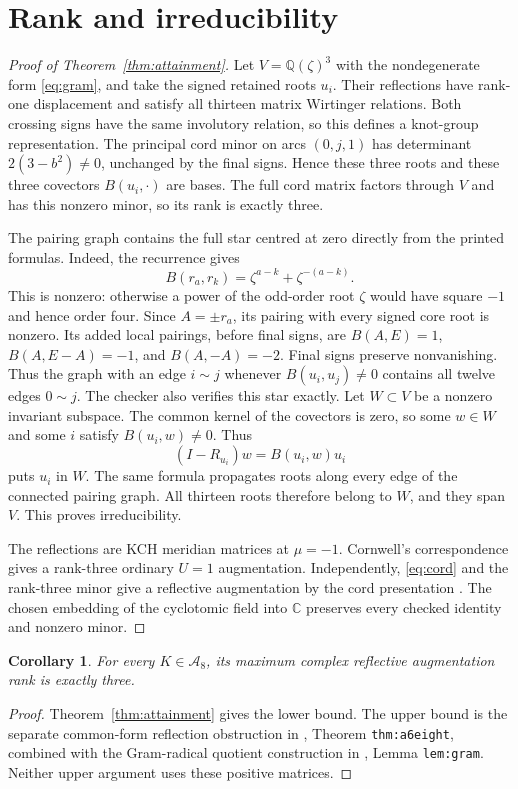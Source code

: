 \documentclass[11pt]{article}
\newtheorem{corollary}[theorem]{Corollary}
\begin{document}
\section{Rank and irreducibility}

\begin{proof}[Proof of Theorem~\ref{thm:attainment}]
Let $V=\mathbb Q(\zeta)^3$ with the nondegenerate form
\eqref{eq:gram}, and take the signed retained roots $u_i$.
Their reflections have rank-one displacement and satisfy
all thirteen matrix Wirtinger relations. Both crossing signs have the
same involutory relation, so this defines a knot-group representation.
The principal cord minor on arcs $(0,j,1)$ has determinant
$2(3-b^2)\ne0$, unchanged by the final signs. Hence these three
roots and these three covectors $B(u_i,\cdot)$ are bases.
The full cord matrix factors through $V$ and has this nonzero minor,
so its rank is exactly three.

The pairing graph contains the full star centred at zero directly
from the printed formulas. Indeed, the recurrence gives
\[
                   B(r_a,r_k)=\zeta^{a-k}+\zeta^{-(a-k)}.
\]
This is nonzero: otherwise a power of the odd-order root $\zeta$
would have square $-1$ and hence order four. Since $A=\pm r_a$,
its pairing with every signed core root is nonzero. Its added local
pairings, before final signs, are $B(A,E)=1$,
$B(A,E-A)=-1$, and $B(A,-A)=-2$. Final signs preserve nonvanishing.
Thus the graph with an edge $i\!\sim\!j$ whenever
$B(u_i,u_j)\ne0$ contains all twelve edges $0\!\sim\!j$.
The checker also verifies this star exactly.
Let $W\subset V$ be a nonzero invariant subspace.
The common kernel of the covectors is zero, so some $w\in W$ and
some $i$ satisfy $B(u_i,w)\ne0$. Thus
\[
                    (I-R_{u_i})w=B(u_i,w)u_i
\]
puts $u_i$ in $W$. The same formula propagates roots along every
edge of the connected pairing graph. All thirteen roots therefore
belong to $W$, and they span $V$. This proves irreducibility.

The reflections are KCH meridian matrices at $\mu=-1$.
Cornwell's correspondence \cite{cornwell17} gives a rank-three ordinary
$U=1$ augmentation. Independently, \eqref{eq:cord} and the rank-three
minor give a reflective augmentation by the cord presentation
\cite{cornwell15}. The chosen embedding of the cyclotomic field into
$\mathbb C$ preserves every checked identity and nonzero minor.
\end{proof}

\begin{corollary}\label{cor:reflective}
For every $K\in\mathcal A_8$, its maximum complex reflective
augmentation rank is exactly three.
\end{corollary}
\begin{proof}
Theorem~\ref{thm:attainment} gives the lower bound. The upper bound is
the separate common-form reflection obstruction in
, Theorem
\texttt{thm:a6eight}, combined with the Gram-radical quotient construction
in , Lemma \texttt{lem:gram}.
Neither upper argument uses these positive matrices.
\end{proof}
\end{document}
